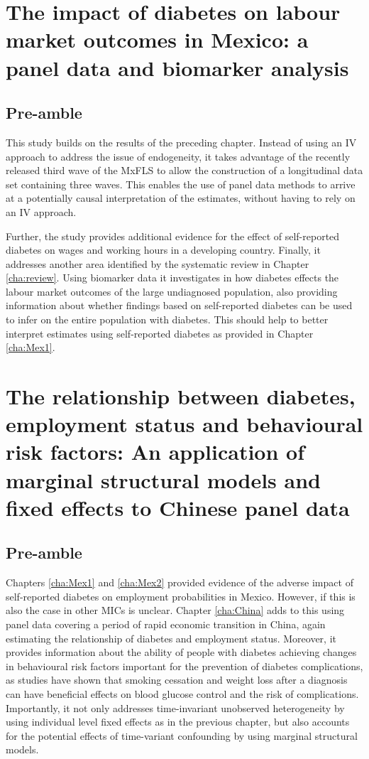 \chapter{\label{cha:Mex2}The impact of diabetes on labour market outcomes in Mexico: a panel data and biomarker analysis}
\section*{Pre-amble}

This study builds on the results of the preceding chapter. Instead of using an \ac{IV} approach to address the issue of endogeneity, it takes advantage of the recently released third wave of the \ac{MxFLS} to allow the construction of a longitudinal data set containing three waves. This enables the use of panel data methods to arrive at a potentially causal interpretation of the estimates, without having to rely on an \ac{IV} approach.

Further, the study provides additional evidence for the effect of self-reported diabetes on wages and working hours in a developing country. Finally, it addresses another area identified by the systematic review in Chapter \ref{cha:review}. Using biomarker data it investigates in how diabetes effects the labour market outcomes of the large undiagnosed population, also providing information about whether findings based on self-reported diabetes can be used to infer on the entire population with diabetes. This should help to better interpret estimates using self-reported diabetes as provided in Chapter \ref{cha:Mex1}.


\acresetall  %
\chapter{\label{cha:China} The relationship between diabetes, employment status and behavioural risk factors: An application of marginal structural models and fixed effects to Chinese panel data}
\section*{Pre-amble}

Chapters \ref{cha:Mex1} and \ref{cha:Mex2} provided evidence of the adverse impact of self-reported diabetes on employment probabilities in Mexico. However, if this is also the case in other \acp{MIC} is unclear. Chapter \ref{cha:China} adds to this using panel data covering a period of rapid economic transition in China, again estimating the relationship of diabetes and employment status. Moreover, it provides information about the ability of people with diabetes achieving changes in behavioural risk factors important for the prevention of diabetes complications, as studies have shown that smoking cessation and weight loss after a diagnosis can have beneficial effects on blood glucose control and the risk of complications. Importantly, it not only addresses time-invariant unobserved heterogeneity by using individual level fixed effects as in the previous chapter, but also accounts for the potential effects of time-variant confounding by using marginal structural models.

